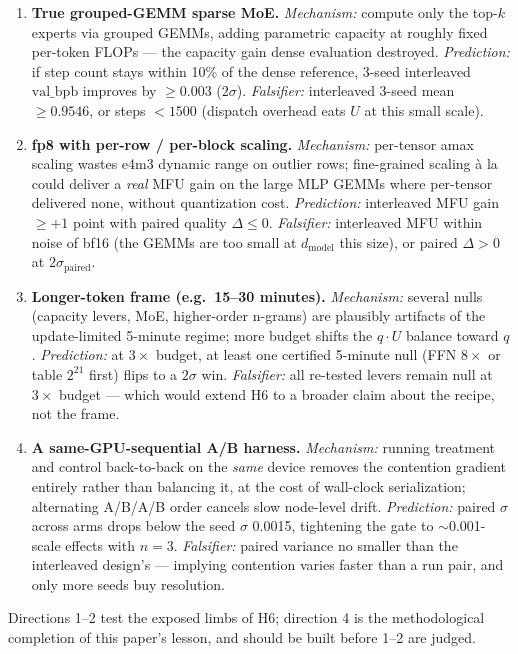 \documentclass{article}
\newcommand{\valbpb}{\mathrm{val\_bpb}}
\begin{document}
\begin{enumerate}
    \item \textbf{True grouped-GEMM sparse MoE.} \emph{Mechanism:} compute only the top-$k$ experts via grouped GEMMs, adding parametric capacity at roughly fixed per-token FLOPs --- the capacity gain dense evaluation destroyed. \emph{Prediction:} if step count stays within 10\% of the dense reference, 3-seed interleaved $\valbpb$ improves by $\geq 0.003$ ($2\sigma$). \emph{Falsifier:} interleaved 3-seed mean $\geq 0.9546$, or steps $< 1500$ (dispatch overhead eats $U$ at this small scale).
    \item \textbf{fp8 with per-row / per-block scaling.} \emph{Mechanism:} per-tensor amax scaling wastes e4m3 dynamic range on outlier rows; fine-grained scaling \`a la \citet{deepseekai2024deepseekv3} could deliver a \emph{real} MFU gain on the large MLP GEMMs where per-tensor delivered none, without quantization cost. \emph{Prediction:} interleaved MFU gain $\geq +1$ point with paired quality $\Delta \leq 0$. \emph{Falsifier:} interleaved MFU within noise of bf16 (the GEMMs are too small at $d_{\mathrm{model}}$ this size), or paired $\Delta > 0$ at $2\sigma_{\mathrm{paired}}$.
    \item \textbf{Longer-token frame (e.g.\ 15--30 minutes).} \emph{Mechanism:} several nulls (capacity levers, MoE, higher-order n-grams) are plausibly artifacts of the update-limited 5-minute regime; more budget shifts the $q \cdot U$ balance toward $q$. \emph{Prediction:} at $3\times$ budget, at least one certified 5-minute null (FFN $8\times$ or table $2^{21}$ first) flips to a $2\sigma$ win. \emph{Falsifier:} all re-tested levers remain null at $3\times$ budget --- which would extend H6 to a broader claim about the recipe, not the frame.
    \item \textbf{A same-GPU-sequential A/B harness.} \emph{Mechanism:} running treatment and control back-to-back on the \emph{same} device removes the contention gradient entirely rather than balancing it, at the cost of wall-clock serialization; alternating A/B/A/B order cancels slow node-level drift. \emph{Prediction:} paired $\sigma$ across arms drops below the seed $\sigma$ 0.0015, tightening the gate to $\sim$0.001-scale effects with $n{=}3$. \emph{Falsifier:} paired variance no smaller than the interleaved design's --- implying contention varies faster than a run pair, and only more seeds buy resolution.
\end{enumerate}

Directions 1--2 test the exposed limbs of H6; direction 4 is the methodological completion of this paper's lesson, and should be built before 1--2 are judged.
\end{document}
